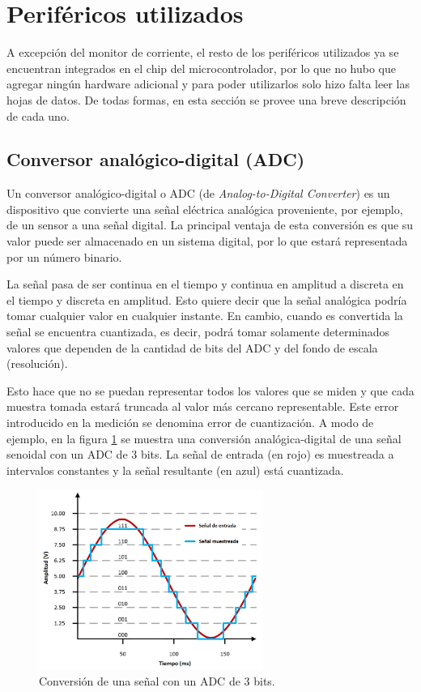 \section{Periféricos utilizados}

A excepción del monitor de corriente, el resto de los periféricos utilizados ya se encuentran integrados en el chip del microcontrolador, por lo que no hubo que agregar ningún hardware adicional y para poder utilizarlos solo hizo falta leer las hojas de datos. De todas formas, en esta sección se provee una breve descripción de cada uno.

\subsection{Conversor analógico-digital (ADC)}

Un conversor analógico-digital o ADC (de \textit{Analog-to-Digital Converter}) es un dispositivo que convierte una señal eléctrica analógica proveniente, por ejemplo, de un sensor a una señal digital. La principal ventaja de esta conversión es que su valor puede ser almacenado en un sistema digital, por lo que estará representada por un número binario.

La señal pasa de ser continua en el tiempo y continua en amplitud a discreta en el tiempo y discreta en amplitud. Esto quiere decir que la señal analógica podría tomar cualquier valor en cualquier instante. En cambio, cuando es convertida la señal se encuentra cuantizada, es decir, podrá tomar solamente determinados valores que dependen de la cantidad de bits del ADC y del fondo de escala (resolución).

Esto hace que no se puedan representar todos los valores que se miden y que cada muestra tomada estará truncada al valor más cercano representable. Este error introducido en la medición se denomina error de cuantización. A modo de ejemplo, en la figura \ref{fig:muestreoADC} se muestra una conversión analógica-digital de una señal senoidal con un ADC de 3 bits. La señal de entrada (en rojo) es muestreada a intervalos constantes y la señal resultante (en azul) está cuantizada.

\begin{figure}[H]
\centering
\includegraphics[width=0.65\textwidth]{./Figures/muestreo.png}
\caption{Conversión de una señal con un ADC de 3 bits.}
\label{fig:muestreoADC}
\end{figure}


